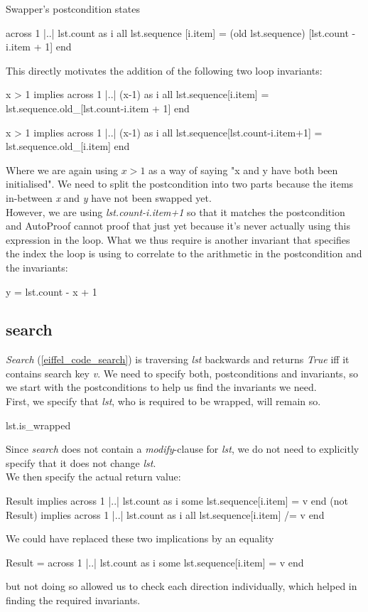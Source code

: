 Swapper's postcondition states
\begin{eSimple}
across 1 |..| lst.count as i all lst.sequence [i.item] = (old lst.sequence) [lst.count - i.item + 1] end
\end{eSimple}
This directly motivates the addition of the following two loop invariants:
\begin{eSimple}
x > 1 implies across 1 |..| (x-1) as i all lst.sequence[i.item] = lst.sequence.old_[lst.count-i.item + 1] end

x > 1 implies across 1 |..| (x-1) as i all lst.sequence[lst.count-i.item+1] = lst.sequence.old_[i.item] end
\end{eSimple}
Where we are again using $x > 1$ as a way of saying "x and y have both been initialised". We need to split the postcondition into two parts because the items in-between \emph{x} and \emph{y} have not been swapped yet.\\

However, we are using \emph{lst.count-i.item+1} so that it matches the postcondition and AutoProof cannot proof that just yet because it's never actually using this expression in the loop. What we thus require is another invariant that specifies the index the loop is using to correlate to the arithmetic in the postcondition and the invariants:
\begin{eSimple}
y = lst.count - x + 1
\end{eSimple}

\subsection{search}
\emph{Search} (\ref{eiffel_code_search}) is traversing \emph{lst} backwards and returns \emph{True} iff it contains search key \emph{v}. We need to specify both, postconditions and invariants, so we start with the postconditions to help us find the invariants we need.\\

First, we specify that \emph{lst}, who is required to be wrapped, will remain so.
\begin{eSimple}
lst.is_wrapped
\end{eSimple}
Since \emph{search} does not contain a \emph{modify}-clause for \emph{lst}, we do not need to explicitly specify that it does not change \emph{lst}.\\

We then specify the actual return value:
\begin{eSimple}
Result implies across 1 |..| lst.count as i some lst.sequence[i.item] = v end
(not Result) implies across 1 |..| lst.count as i all lst.sequence[i.item] /= v end
\end{eSimple}
We could have replaced these two implications by an equality
\begin{eSimple}
Result = across 1 |..| lst.count as i some lst.sequence[i.item] = v end
\end{eSimple}
but not doing so allowed us to check each direction individually, which helped in finding the required invariants.\\

